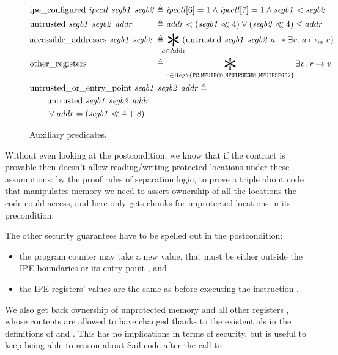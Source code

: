 \begin{figure}
  \centering
  \begin{align*}
    &\begin{alignedat}{2}
      &\pred{ipe\_configured}~\mathit{ipectl}~\mathit{segb1}~\mathit{segb2}
      &&\triangleq \mathit{ipectl}[6] = 1 \wedge \mathit{ipectl}[7] = 1 \wedge \mathit{segb1} < \mathit{segb2}
      \\
      &\pred{untrusted}~\mathit{segb1}~\mathit{segb2}~\mathit{addr}
      &&\triangleq \mathit{addr} < (\mathit{segb1} \ll 4) \vee (\mathit{segb2} \ll 4) \leq addr
      \\
      &\pred{accessible\_addresses}~\mathit{segb1}~\mathit{segb2}
      &&\triangleq \bigast_{\mathclap{a \in \pred{Addr}}}
         \left(\pred{untrusted}~\mathit{segb1}~\mathit{segb2}~a
         \wand \exists v.\; a \ptom v\right) \\
      &\pred{other\_registers}
      &&\triangleq \bigast_{r \in \pred{Reg} \setminus \left\{ \reg{PC}, \reg{MPUIPC0}, \reg{MPUIPSEGB1}, \reg{MPUIPSEGB2}\right\}} \exists v.\; r \ptor v
    \end{alignedat} \\
    &\begin{aligned}
      &\pred{untrusted\_or\_entry\_point}~\mathit{segb1}~\mathit{segb2}~\mathit{addr} \triangleq \\
      &\qquad\pred{untrusted}~\mathit{segb1}~\mathit{segb2}~\mathit{addr} \\
      &\qquad\vee \mathit{addr} = (\mathit{segb1} \ll 4 + 8)
    \end{aligned}
  \end{align*}
  \caption{Auxiliary predicates.}
  \label{fig:aux-preds}
\end{figure}

Without even looking at the postcondition, we know that if the contract is provable then  doesn't allow reading/writing protected locations under these assumptions: by the proof rules of separation logic, to prove a triple about code that manipulates memory we need to assert ownership of all the locations the code could access, and here  only gets chunks for unprotected locations in its precondition.

The other security guarantees have to be spelled out in the postcondition:
\begin{itemize}
\item the program counter may take a new value, that must be either outside the IPE boundaries or its entry point , and
\item the IPE registers' values are the same as before executing the instruction .
\end{itemize}
We also get back ownership of unprotected memory and all other registers , whose contents are allowed to have changed thanks to the existentials in the definitions of  and . This has no implications in terms of security, but is useful to keep being able to reason about Sail code after the call to .

